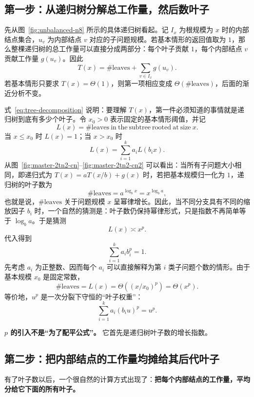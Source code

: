 \documentclass[11pt,a4paper]{article}
\begin{document}
\subsection{第一步：从递归树分解总工作量，然后数叶子}
先从图~\ref{fig:unbalanced-n8} 所示的具体递归树看起。记 $I_x$ 为根规模为 $x$ 时的内部结点集合，$u_v$ 为内部结点 $v$ 对应的子问题规模。若基本情形的返回值取为 $1$，那么整棵递归树的总工作量可以直接分成两部分：每个叶子贡献 $1$，每个内部结点 $v$ 贡献工作量 $g(u_v)$。因此
\begin{equation}
T(x)
=
\#\mathrm{leaves}
+
\sum_{v\in I_x} g(u_v).
\label{eq:tree-decomposition}
\end{equation}
若基本情形只要求 $T(x)=\Theta(1)$，则第一项相应变成 $\Theta(\#\mathrm{leaves})$，后面的渐近分析不变。

式~\eqref{eq:tree-decomposition} 说明：要理解 $T(x)$，第一件必须知道的事情就是递归树到底有多少个叶子。令 $x_0>0$ 表示固定的基本情形阈值，并记
\begin{equation}
L(x)=\#\mathrm{leaves\ in\ the\ subtree\ rooted\ at\ size\ }x.
\end{equation}
当 $x\le x_0$ 时 $L(x)=1$；当 $x>x_0$ 时
\begin{equation}
L(x)=\sum_{i=1}^k a_iL(b_i x).
\end{equation}
从图~\ref{fig:master-2tn2-cn}--\ref{fig:master-2tn2-cn2} 可以看出：当所有子问题大小相同，即递归式为 $T(x)=aT(x/b)+g(x)$ 时，若把基本规模归一化为 $1$，递归树的叶子数为
\[
\#\mathrm{leaves}=a^{\log_b x}=x^{\log_b a},
\]
也就是说，$\#\mathrm{leaves}$ 关于问题规模 $x$ 呈幂律增长。因此，当不同分支具有不同的缩放因子 $b_i$ 时，一个自然的猜测是：叶子数仍保持幂律形式，只是指数不再简单等于 $\log_b a$。于是猜测
\[
L(x)\asymp x^p.
\]
代入得到
\begin{equation}
\sum_{i=1}^k a_i b_i^p=1.
\end{equation}
先考虑 $a_i$ 为正整数、因而每个 $a_i$ 可以直接解释为第 $i$ 类子问题个数的情形。由于基本规模 $x_0$ 是固定常数，
\begin{equation}
\#\mathrm{leaves}=L(x)=\Theta\!\left((x/x_0)^p\right)=\Theta(x^p).
\end{equation}
等价地，$u^p$ 是一次分裂下守恒的“叶子权重”：
\[
\sum_{i=1}^k a_i(b_i u)^p=u^p.
\]

\begin{tcolorbox}
\textbf{$p$ 的引入不是“为了配平公式”。} 它首先是递归树叶子数的增长指数。
\end{tcolorbox}

\subsection{第二步：把内部结点的工作量均摊给其后代叶子}
有了叶子数以后，一个很自然的计算方式出现了：\textbf{把每个内部结点的工作量，平均分给它下面的所有叶子。}
\end{document}
